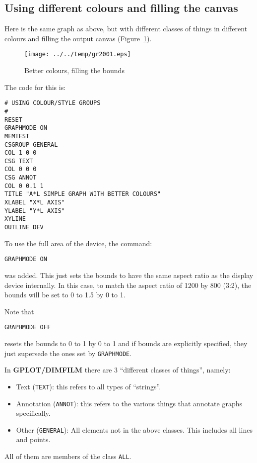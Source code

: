 \documentclass[a4paper,twoside,11pt]{article}
\makeatletter
\def\maxwidth{%
  \ifdim\Gin@nat@width>\linewidth
    \linewidth
  \else
    \Gin@nat@width
  \fi
}
\newcommand{\newpara}{\par\vspace{4mm}\noindent}
\makeatother
\begin{document}
\subsection{Using different colours and filling the canvas}\label{using-different-colours-and-filling-the-canvas}
\newpara
Here is the same graph as above, but with different classes of things in
different colours and filling the output canvas (Figure~\ref{fig:gr2001}).

\begin{figure}
  \centering
  \texttt{[image: ../../temp/gr2001.eps]}
  \caption{Better colours, filling the bounds}
  \label{fig:gr2001}
\end{figure}

\newpara
The code for this is:
\begin{lstlisting}
# USING COLOUR/STYLE GROUPS
#
RESET
GRAPHMODE ON
MEMTEST
CSGROUP GENERAL
COL 1 0 0
CSG TEXT
COL 0 0 0
CSG ANNOT
COL 0 0.1 1
TITLE "A*L SIMPLE GRAPH WITH BETTER COLOURS"
XLABEL "X*L AXIS"
YLABEL "Y*L AXIS"
XYLINE
OUTLINE DEV
\end{lstlisting}

\newpara
To use the full area of the device, the command:
\begin{lstlisting}
GRAPHMODE ON
\end{lstlisting}

\newpara
was added. This just sets the bounds to have the same aspect ratio as
the display device internally. In this case, to match the aspect ratio
of 1200 by 800 (3:2), the bounds will be set to 0 to 1.5 by 0 to 1.

\newpara
Note that
\begin{lstlisting}
GRAPHMODE OFF
\end{lstlisting}
resets the bounds to 0 to 1 by 0 to 1 and if bounds are explicitly
specified, they just supersede the ones set by \texttt{GRAPHMODE}.

\newpara
In \textbf{GPLOT/DIMFILM} there are 3 ``different classes of things'', namely:
\begin{itemize}
\item
  Text (\texttt{TEXT}): this refers to all types of ``strings''.
\item
  Annotation (\texttt{ANNOT}): this refers to the various things that
  annotate graphs specifically.
\item
  Other (\texttt{GENERAL}): All elements not in the above classes. This
  includes all lines and points.
\end{itemize}
All of them are members of the class \texttt{ALL}.
\end{document}
